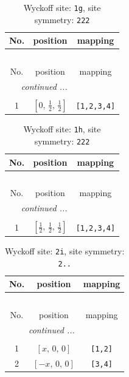 \documentclass[fleqn,8pt]{jsarticle}
\begin{document}
\renewcommand{\arraystretch}{1.2}
\begin{longtable}{ccc}
\caption{Wyckoff site: {\tt 1g}, site symmetry: {\tt 222}}
 \\
 \hline \hline
No. & position & mapping \\ \hline \endfirsthead

\multicolumn{2}{l}{\tablename\ \thetable{}} \\
 \hline \hline
No. & position & mapping \\ \hline \endhead

 \hline \hline
\multicolumn{2}{r}{\footnotesize\it continued ...} \\ \endfoot

 \hline \hline
\multicolumn{2}{r}{} \\ \endlastfoot

1 & $\left[ 0,\, \frac{1}{2},\, \frac{1}{2} \right]$ & {\tt [1,2,3,4]} \\
\end{longtable}
\renewcommand{\arraystretch}{1.2}
\begin{longtable}{ccc}
\caption{Wyckoff site: {\tt 1h}, site symmetry: {\tt 222}}
 \\
 \hline \hline
No. & position & mapping \\ \hline \endfirsthead

\multicolumn{2}{l}{\tablename\ \thetable{}} \\
 \hline \hline
No. & position & mapping \\ \hline \endhead

 \hline \hline
\multicolumn{2}{r}{\footnotesize\it continued ...} \\ \endfoot

 \hline \hline
\multicolumn{2}{r}{} \\ \endlastfoot

1 & $\left[ \frac{1}{2},\, \frac{1}{2},\, \frac{1}{2} \right]$ & {\tt [1,2,3,4]} \\
\end{longtable}
\renewcommand{\arraystretch}{1.2}
\begin{longtable}{ccc}
\caption{Wyckoff site: {\tt 2i}, site symmetry: {\tt 2..}}
 \\
 \hline \hline
No. & position & mapping \\ \hline \endfirsthead

\multicolumn{2}{l}{\tablename\ \thetable{}} \\
 \hline \hline
No. & position & mapping \\ \hline \endhead

 \hline \hline
\multicolumn{2}{r}{\footnotesize\it continued ...} \\ \endfoot

 \hline \hline
\multicolumn{2}{r}{} \\ \endlastfoot

1 & $\left[ x,\, 0,\, 0 \right]$ & {\tt [1,2]} \\ \hline
2 & $\left[ - x,\, 0,\, 0 \right]$ & {\tt [3,4]} \\
\end{longtable}
\end{document}

